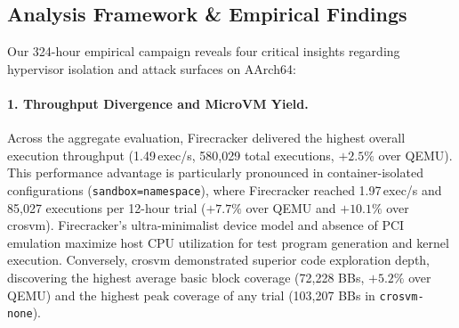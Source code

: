 \documentclass{article}
\begin{document}
\begin{table}[h]
\centering
\small
\caption{Cross-Sandbox Fuzzing Yield and Attack-Surface Breakdown (3 Repetitions per Configuration, 12h per Run)}\label{tab:sandbox_summary}
\end{table}

\subsection{Analysis Framework \& Empirical Findings}
Our 324-hour empirical campaign reveals four critical insights regarding hypervisor isolation and attack surfaces on AArch64:

\paragraph{1. Throughput Divergence and MicroVM Yield.}
Across the aggregate evaluation, Firecracker delivered the highest overall execution throughput (1.49\,exec/s, 580,029 total executions, $+2.5\%$ over QEMU). This performance advantage is particularly pronounced in container-isolated configurations (\texttt{sandbox=namespace}), where Firecracker reached 1.97\,exec/s and 85,027 executions per 12-hour trial ($+7.7\%$ over QEMU and $+10.1\%$ over crosvm). Firecracker's ultra-minimalist device model and absence of PCI emulation maximize host CPU utilization for test program generation and kernel execution. Conversely, crosvm demonstrated superior code exploration depth, discovering the highest average basic block coverage (72,228 BBs, $+5.2\%$ over QEMU) and the highest peak coverage of any trial (103,207 BBs in \texttt{crosvm-none}).
\end{document}
